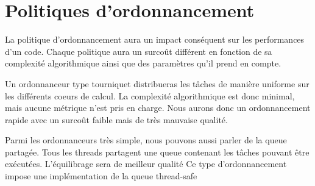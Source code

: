 \section{Politiques d'ordonnancement}
La politique d'ordonnancement aura un impact conséquent sur les performances d'un code.
%
Chaque politique aura un surcoût différent en fonction de sa complexité algorithmique ainsi que des paramètres qu'il prend en compte.


Un ordonnanceur type tourniquet distribueras les tâches de manière uniforme sur les différents coeurs de calcul.
%
La complexité algorithmique est donc minimal, mais aucune métrique n'est pris en charge.
%
Nous aurons donc un ordonnancement rapide avec un surcoût faible mais de très mauvaise qualité.


Parmi les ordonnanceurs très simple, nous pouvons aussi parler de la queue partagée.
%
Tous les threads partagent une queue contenant les tâches pouvant être exécutées.
%
L'équilibrage sera de meilleur qualité
%
Ce type d'ordonnancement impose une implémentation de la queue thread-safe
